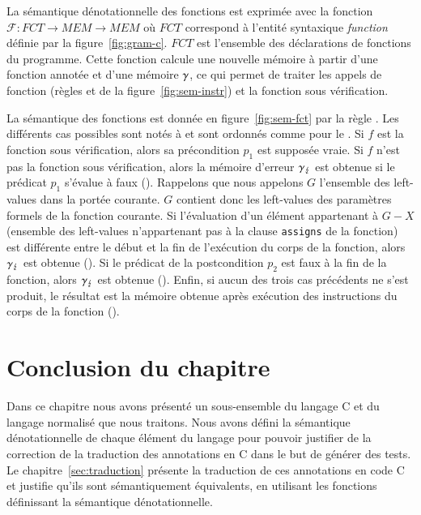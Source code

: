


La sémantique dénotationnelle des fonctions est exprimée avec la fonction
$\mathcal{F} : FCT \rightarrow MEM \rightarrow MEM$ où $FCT$ correspond à
l'entité syntaxique \textit{function} définie par la figure~\ref{fig:gram-c}.
$FCT$ est l'ensemble des déclarations de fonctions du programme.
Cette fonction calcule une nouvelle mémoire à partir d'une fonction annotée et
d'une mémoire $\gamma$, ce qui permet de traiter les appels de fonction (règles
 et  de la figure~\ref{fig:sem-instr}) et la
fonction sous vérification.

La sémantique des fonctions est donnée en figure~\ref{fig:sem-fct} par la règle
.
Les différents cas possibles sont notés  à  et sont
ordonnés comme pour le .
Si $f$ est la fonction sous vérification, alors sa précondition $p_1$ est
supposée vraie.
Si $f$ n'est pas la fonction sous vérification, alors la mémoire d'erreur
$\gamma_\lightning$ est obtenue si le prédicat $p_1$ s'évalue à faux ().
Rappelons que nous appelons $G$ l'ensemble des left-values dans la portée
courante.
$G$ contient donc les left-values des paramètres formels de la fonction
courante.
Si l'évaluation d'un élément appartenant à $G-X$ (ensemble des left-values
n'appartenant pas à la clause \lstinline'assigns' de la fonction) est différente
entre le début et la fin de l'exécution du corps de la fonction, alors
$\gamma_\lightning$ est obtenue ().
Si le prédicat de la postcondition $p_2$ est faux à la fin de la fonction, alors
$\gamma_\lightning$ est obtenue ().
Enfin, si aucun des trois cas précédents ne s'est produit, le résultat est la
mémoire obtenue après exécution des instructions du corps de la fonction
().


\section*{Conclusion du chapitre}

Dans ce chapitre nous avons présenté un sous-ensemble du langage C et du
langage \eacsl normalisé que nous traitons.
Nous avons défini la sémantique dénotationnelle de chaque élément du langage
pour pouvoir justifier de la correction de la traduction des annotations en C
dans le but de générer des tests.
Le chapitre~\ref{sec:traduction} présente la traduction de ces annotations
\eacsl en code C et justifie qu'ils sont sémantiquement équivalents, en
utilisant les fonctions définissant la sémantique dénotationnelle.
